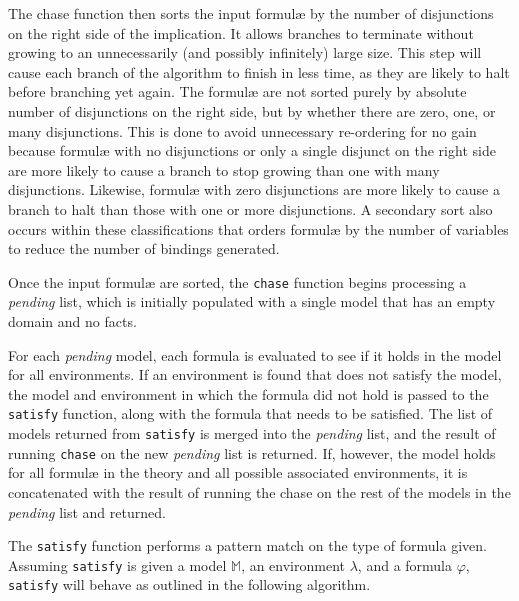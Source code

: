 	The chase function then sorts the input formul{\ae} by the number of
	disjunctions on the right side of the implication. It allows branches to
	terminate without growing to an unnecessarily (and possibly infinitely)
	large size. This step will cause each branch of the algorithm to finish in
	less time, as they are likely to halt before branching yet again. The
	formul{\ae} are not sorted purely by absolute number of disjunctions on the
	right side, but by whether there are zero, one, or many disjunctions. This
	is done to avoid unnecessary re-ordering for no gain because formul{\ae}
	with no disjunctions or only a single disjunct on the right side are more
	likely to cause a branch to stop growing than one with many disjunctions.
	Likewise, formul{\ae} with zero disjunctions are more likely to cause a
	branch to halt than those with one or more disjunctions. A secondary sort
	also occurs within these classifications that orders formul{\ae} by the
	number of variables to reduce the number of bindings generated.

	Once the input formul{\ae} are sorted, the {\tt chase} function begins
	processing a \emph{pending} list, which is initially populated with a
	single model that has an empty domain and no facts.

	For each \emph{pending} model, each formula is evaluated to see if it holds
	in the model for all environments. If an environment is found that does not
	satisfy the model, the model and environment in which the formula did not
	hold is passed to the {\tt satisfy} function, along with the formula that needs
	to be satisfied. The list of models returned from {\tt satisfy} is merged into
	the \emph{pending} list, and the result of running {\tt chase} on the new
	\emph{pending} list is returned. If, however, the model holds for all
	formul{\ae} in the theory and all possible associated environments, it is
	concatenated with the result of running the chase on the rest of the models
	in the \emph{pending} list and returned.

	The {\tt satisfy} function performs a pattern match on the type of formula
	given. Assuming {\tt satisfy} is given a model $\mathbb{M}$, an environment
	$\lambda$, and a formula $\varphi$, {\tt satisfy} will behave as outlined
	in the following algorithm.

	~\\

